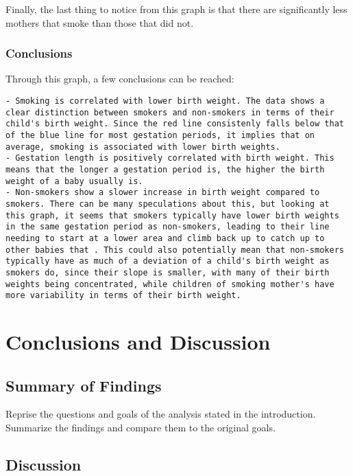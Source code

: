 \documentclass[
]{article}
\begin{document}
Finally, the last thing to notice from this graph is that there are
significantly less mothers that smoke than those that did not.

\subsubsection{Conclusions}\label{conclusions-5}

Through this graph, a few conclusions can be reached:

\begin{verbatim}
- Smoking is correlated with lower birth weight. The data shows a clear distinction between smokers and non-smokers in terms of their child's birth weight. Since the red line consistenly falls below that of the blue line for most gestation periods, it implies that on average, smoking is associated with lower birth weights.
- Gestation length is positively correlated with birth weight. This means that the longer a gestation period is, the higher the birth weight of a baby usually is.
- Non-smokers show a slower increase in birth weight compared to smokers. There can be many speculations about this, but looking at this graph, it seems that smokers typically have lower birth weights in the same gestation period as non-smokers, leading to their line needing to start at a lower area and climb back up to catch up to other babies that . This could also potentially mean that non-smokers typically have as much of a deviation of a child's birth weight as smokers do, since their slope is smaller, with many of their birth weights being concentrated, while children of smoking mother's have more variability in terms of their birth weight.
\end{verbatim}

\section{Conclusions and Discussion}\label{conclusions-and-discussion}

\subsection{Summary of Findings}\label{summary-of-findings}

Reprise the questions and goals of the analysis stated in the
introduction. Summarize the findings and compare them to the original
goals.

\subsection{Discussion}\label{discussion}
\end{document}
